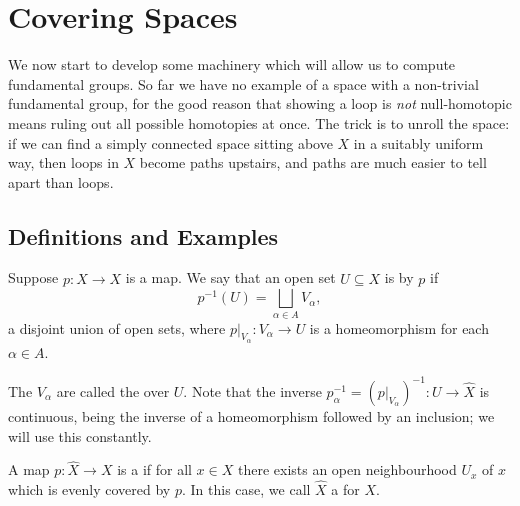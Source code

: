 \section{Covering Spaces}

We now start to develop some machinery which will allow us to compute fundamental
groups. So far we have no example of a space with a non-trivial fundamental group, for
the good reason that showing a loop is \emph{not} null-homotopic means ruling out all
possible homotopies at once. The trick is to unroll the space: if we can find a
simply connected space sitting above $X$ in a suitably uniform way, then loops in $X$
become paths upstairs, and paths are much easier to tell apart than loops.

\subsection{Definitions and Examples}

\begin{definition}
	Suppose $p: \hat{X} \rightarrow X$ is a map. We say that an open set $U \subseteq X$ is  by $p$ if
	$$
	p^{-1}(U)=\bigsqcup_{\alpha \in A} V_\alpha,
	$$
	a disjoint union of open sets, where $p|_{V_\alpha}: V_\alpha \rightarrow U$ is a homeomorphism for each $\alpha \in A$.
\end{definition}

The $V_\alpha$ are called the  over $U$. Note that the inverse
$p_\alpha^{-1} = (p|_{V_\alpha})^{-1}: U \to \hat X$ is continuous, being the inverse of
a homeomorphism followed by an inclusion; we will use this constantly.

\begin{definition}
	A map $p: \hat{X} \rightarrow X$ is a  if for all $x \in X$ there exists an open neighbourhood $U_x$ of $x$ which is evenly covered by $p$. In this case, we call $\hat{X}$ a  for $X$.
\end{definition}

\begin{center}
\end{center}

